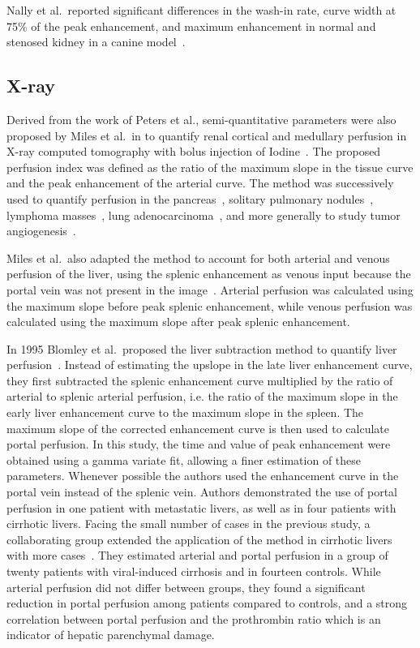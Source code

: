 Nally et al.~reported significant differences in the wash-in rate, curve width at 75\% of the peak enhancement, and maximum enhancement in normal and stenosed kidney in a canine model~\cite{Nally:1985te}. 


\subsection{X-ray}
\label{sec:SQRadiography}
Derived from the work of Peters et al., semi-quantitative parameters were also proposed by Miles et al.~in \citeyear{Miles:1991et} to quantify renal cortical and medullary perfusion in X-ray computed tomography with bolus injection of Iodine~\cite{Miles:1991et,Miles:1991ei}. 
The proposed perfusion index was defined as the ratio of the maximum slope in the tissue curve and the peak enhancement of the arterial curve. 
The method was successively used to quantify perfusion in the pancreas~\cite{Miles:2014ea}, solitary pulmonary nodules~\cite{Zhang:1997bi}, lymphoma masses~\cite{Dugdale:1999co}, lung adenocarcinoma~\cite{Tateishi:2001fz}, and more generally to study tumor angiogenesis~\cite{Tateishi:2001fz,Miles:2002eu}.

Miles et al.~also adapted the method to account for both arterial and venous perfusion of the liver, using the splenic enhancement as venous input because the portal vein was not present in the image~\cite{Miles:1993cq}.
Arterial perfusion was calculated using the maximum slope before peak splenic enhancement, while venous perfusion was calculated using the maximum slope after peak splenic enhancement.

In 1995 Blomley et al.~proposed the liver subtraction method to quantify liver perfusion~\cite{Blomley:1995vs}. 
Instead of estimating the upslope in the late liver enhancement curve, they first subtracted the splenic enhancement curve multiplied by the ratio of arterial to splenic arterial perfusion, i.e. the ratio of the maximum slope in the early liver enhancement curve to the maximum slope in the spleen. 
The maximum slope of the corrected enhancement curve is then used to calculate portal perfusion.
In this study, the time and value of peak enhancement were obtained using a gamma variate fit, allowing a finer estimation of these parameters.
Whenever possible the authors used the enhancement curve in the portal vein instead of the splenic vein.
Authors demonstrated the use of portal perfusion in one patient with metastatic livers, as well as in four patients with cirrhotic livers.
Facing the small number of cases in the previous study, a collaborating group extended the application of the method in cirrhotic livers with more cases~\cite{Tsushima:1999vc}.
They estimated arterial and portal perfusion in a group of twenty patients with viral-induced cirrhosis and in fourteen controls. 
While arterial perfusion did not differ between groups, they found a significant reduction in portal perfusion among patients compared to controls, and a strong correlation between portal perfusion and the prothrombin ratio which is an indicator of hepatic parenchymal damage.

